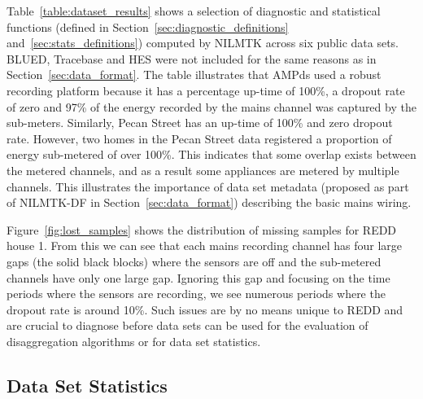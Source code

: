 \documentclass{sig-alternate}
\newcommand{\secref}[1]{Section~\ref{#1}}
\newcommand{\tabref}[1]{Table~\ref{#1}}
\begin{document}
\noindent
\tabref{table:dataset_results} shows a selection of diagnostic and statistical functions 
(defined in Section~\ref{sec:diagnostic_definitions} and~\ref{sec:stats_definitions}) computed by NILMTK
across six public data sets. BLUED, Tracebase and HES were not included for the same reasons as in \secref{sec:data_format}. The table illustrates
that AMPds used a robust recording platform because it has a
percentage up-time of 100\%, a dropout rate of zero and 97\% of the
energy recorded by the mains channel was captured by the sub-meters.
Similarly, Pecan Street has an up-time of 100\% and zero dropout rate.  However, two homes
in the Pecan Street data registered a proportion of energy sub-metered of over
100\%. This indicates that some overlap exists between the metered channels, and as a result some appliances are metered by multiple channels.
This illustrates the importance of data set metadata (proposed as part
of NILMTK-DF in Section~\ref{sec:data_format}) describing the basic
mains wiring.

Figure~\ref{fig:lost_samples} shows the distribution of missing
samples for REDD house 1.  From this we can see that each mains
recording channel has four large gaps (the solid black blocks) where
the sensors are off and the sub-metered channels have
only one large gap.  Ignoring this gap and focusing on the time
periods where the sensors are recording, we see numerous periods where
the dropout rate is around 10\%.  Such issues are by no means unique
to REDD and are crucial to diagnose before data sets can be used for
the evaluation of disaggregation algorithms or for data set
statistics.

\subsection{Data Set Statistics}
\end{document}
